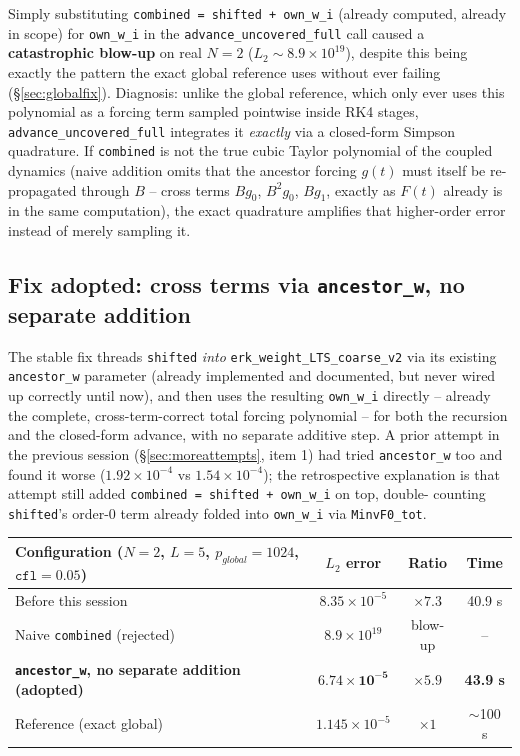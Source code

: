 \documentclass[11pt]{article}
\begin{document}
Simply substituting \texttt{combined = shifted + own\_w\_i} (already
computed, already in scope) for \texttt{own\_w\_i} in the
\texttt{advance\_uncovered\_full} call caused a \textbf{catastrophic
blow-up} on real $N=2$ ($L_2\sim8.9\times10^{19}$), despite this being
exactly the pattern the exact global reference uses without ever
failing (\S\ref{sec:globalfix}). Diagnosis: unlike the global
reference, which only ever uses this polynomial as a forcing term
sampled pointwise inside RK4 stages, \texttt{advance\_uncovered\_full}
integrates it \emph{exactly} via a closed-form Simpson quadrature. If
\texttt{combined} is not the true cubic Taylor polynomial of the
coupled dynamics (naive addition omits that the ancestor forcing
$g(t)$ must itself be re-propagated through $B$ -- cross terms $Bg_0$,
$B^2g_0$, $Bg_1$, exactly as $F(t)$ already is in the same
computation), the exact quadrature amplifies that higher-order error
instead of merely sampling it.

\subsection{Fix adopted: cross terms via \texttt{ancestor\_w}, no
separate addition}

The stable fix threads \texttt{shifted} \emph{into}
\texttt{erk\_weight\_LTS\_coarse\_v2} via its existing
\texttt{ancestor\_w} parameter (already implemented and documented,
but never wired up correctly until now), and then uses the resulting
\texttt{own\_w\_i} directly -- already the complete, cross-term-correct
total forcing polynomial -- for both the recursion and the closed-form
advance, with no separate additive step. A prior attempt in the
previous session (\S\ref{sec:moreattempts}, item 1) had tried
\texttt{ancestor\_w} too and found it worse ($1.92\times10^{-4}$ vs
$1.54\times10^{-4}$); the retrospective explanation is that attempt
still added \texttt{combined = shifted + own\_w\_i} on top, double-
counting \texttt{shifted}'s order-0 term already folded into
\texttt{own\_w\_i} via \texttt{MinvF0\_tot}.

\begin{center}
\begin{tabular}{@{}lccc@{}}
\toprule
Configuration ($N=2$, $L=5$, $p_{global}=1024$, $\texttt{cfl}=0.05$) & $L_2$ error & Ratio & Time \\
\midrule
Before this session & $8.35\times10^{-5}$ & $\times7.3$ & 40.9 s \\
Naive \texttt{combined} (rejected) & $8.9\times10^{19}$ & blow-up & -- \\
\textbf{\texttt{ancestor\_w}, no separate addition (adopted)} & $\mathbf{6.74\times10^{-5}}$ & $\mathbf{\times5.9}$ & \textbf{43.9 s} \\
Reference (exact global) & $1.145\times10^{-5}$ & $\times1$ & $\sim$100 s \\
\bottomrule
\end{tabular}
\end{center}
\end{document}
